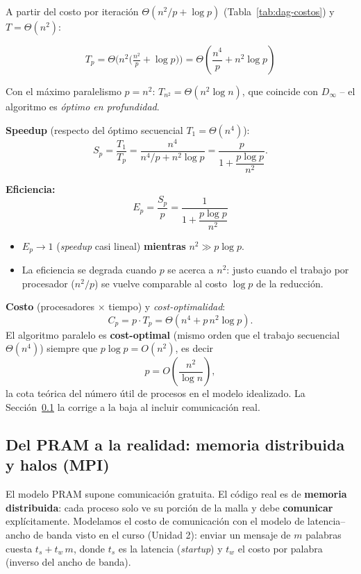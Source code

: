 \documentclass[11pt,a4paper]{article}
\begin{document}
	A partir del costo por iteración $\Theta(n^2/p+\log p)$ (Tabla~\ref{tab:dag-costos})
	y $T=\Theta(n^2)$:

	\[
	\boxed{T_p = \Theta\!\Big(n^2\big(\tfrac{n^2}{p}+\log p\big)\Big)
	= \Theta\!\left(\frac{n^4}{p}+n^2\log p\right)}
	\]

	Con el máximo paralelismo $p=n^2$: $T_{n^2}=\Theta(n^2\log n)$, que coincide con
	$D_\infty$ -- el algoritmo es \textit{óptimo en profundidad}.

	\textbf{Speedup} (respecto del óptimo secuencial $T_1=\Theta(n^4)$):
	\[
	S_p = \frac{T_1}{T_p} = \frac{n^4}{n^4/p+n^2\log p}
	= \frac{p}{1+\dfrac{p\log p}{n^2}} .
	\]

	\textbf{Eficiencia:}
	\[
	\boxed{E_p = \frac{S_p}{p} = \frac{1}{1+\dfrac{p\log p}{n^2}}}
	\]

	\begin{itemize}
		\item $E_p\to1$ (\textit{speedup} casi lineal) \textbf{mientras}
		$n^2 \gg p\log p$.
		\item La eficiencia se degrada cuando $p$ se acerca a $n^2$: justo cuando el
		trabajo por procesador ($n^2/p$) se vuelve comparable al costo $\log p$ de la
		reducción.
	\end{itemize}

	\textbf{Costo} (procesadores $\times$ tiempo) y \textit{cost-optimalidad}:
	\[
	C_p = p\cdot T_p = \Theta(n^4+p\,n^2\log p).
	\]
	El algoritmo paralelo es \textbf{cost-optimal} (mismo orden que el trabajo
	secuencial $\Theta(n^4)$) siempre que $p\log p=O(n^2)$, es decir
	\[
	p = O\!\left(\frac{n^2}{\log n}\right),
	\]
	la cota teórica del número útil de procesos en el modelo idealizado. La
	Sección~\ref{sec:bsp} la corrige a la baja al incluir comunicación real.

	\subsection{Del PRAM a la realidad: memoria distribuida y halos (MPI)}
	\label{sec:bsp}

	El modelo PRAM supone comunicación gratuita. El código real es de
	\textbf{memoria distribuida}: cada proceso solo ve su porción de la malla y debe
	\textbf{comunicar} explícitamente. Modelamos el costo de comunicación con el
	modelo de latencia--ancho de banda visto en el curso (Unidad 2): enviar un
	mensaje de $m$ palabras cuesta $t_s+t_w\,m$, donde $t_s$ es la latencia
	(\textit{startup}) y $t_w$ el costo por palabra (inverso del ancho de banda).
\end{document}

